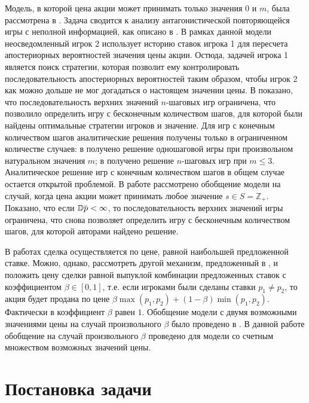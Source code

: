 \documentclass[12pt, draft]{extarticle}
\newcommand{\overbar}[1]%
{\mkern 1.5mu\overline{\mkern-1.3mu#1\mkern-1.3mu}\mkern 1.3mu}
\newcommand{\s}{\ensuremath{s}}
\newcommand{\p}{\ensuremath{\overbar{p}}}
\begin{document}
Модель, в которой цена акции может принимать только значения $0$ и $m$, была
рассмотрена в \cite{bib:domansky07}. Задача сводится к анализу антагонистической
повторяющейся игры с неполной информацией, как описано в \cite{bib:aumann}. В
рамках данной модели неосведомленный игрок 2 использует историю ставок игрока 1
для пересчета апостериорных вероятностей значения цены акции. Остюда, задачей
игрока 1 является поиск стратегии, которая позволит ему контролировать
последовательность апостериорных вероятностей таким образом, чтобы игрок 2 как
можно дольше не мог догадаться о настоящем значении цены. В
\cite{bib:domansky07} показано, что последовательность верхних значений
$n$-шаговых игр ограничена, что позволило определить игру с бесконечным
количеством шагов, для которой были найдены оптимальные стратегии игроков и
значение.
%
Для игр с конечным количеством шагов аналитические решения получены только в
ограниченном количестве случаев: в \cite{bib:sandomirskaya12} получено решение
одношаговой игры при произвольном натуральном значения $m$; в \cite{bib:kreps09}
получено решение $n$-шаговых игр при $m \leqslant 3$. Аналитическое решение игр
с конечным количеством шагов в общем случае остается открытой проблемой.
%
В работе \cite{bib:domansky11} рассмотрено обобщение модели на случай, когда
цена акции может принимать любое значение $\s \in S = \mathbb{Z}_+$. Показано,
что если $\mathbb{D} \p < \infty$, то последовательность верхних значений игры
ограничена, что снова позволяет определить игру с бесконечным количеством шагов,
для которой авторами найдено решение.

В работах \cite{bib:domansky07, bib:domansky11} сделка осуществляется по цене,
равной наибольшей предложенной ставке. Можно, однако, рассмотреть другой
механизм, предложенный в \cite{bib:chatterjee83}, и положить цену сделки равной
выпуклой комбинации предложенных ставок с коэффициентом $\beta \in [0,1]$, т.е.
если игроками были сделаны ставки $p_1 \neq p_2$, то акция будет продана по цене
$\beta \max(p_1, p_2) + (1-\beta) \min(p_1, p_2)$. Фактически в
\cite{bib:domansky07, bib:domansky11} коэффициент $\beta$ равен $1$. Обобщение
модели с двумя возможными значениями цены на случай произвольного $\beta$ было
проведено в \cite{bib:pyanykh16}. В данной работе обобщение на случай
произвольного $\beta$ проведено для модели со счетным множеством возможных
значений цены.

\section{Постановка задачи}
\label{sec:problem-statement}
\end{document}

